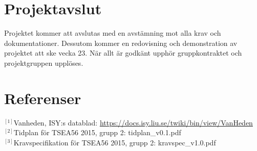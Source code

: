 \documentclass[11pt]{article}
\begin{document}
\begin{flushleft}
\section{Projektavslut}
Projektet kommer att avslutas med en avstämning mot alla krav och dokumentationer. Dessutom kommer en redovisning och demonstration av projektet att ske vecka 23. När allt är godkänt upphör gruppkontraktet och projektgruppen upplöses.
\\[0.1in]



\setcounter{secnumdepth}{0}
\pagebreak
\section{Referenser}


$^{[1]}$Vanheden, ISY:s datablad: \url{https://docs.isy.liu.se/twiki/bin/view/VanHeden} \\[0.1in]

$^{[2]}$Tidplan för TSEA56 2015, grupp 2: tidplan\_v0.1.pdf \\[0.1in]

$^{[3]}$Kravspecifikation för TSEA56 2015, grupp 2: kravspec\_v1.0.pdf \\[0.1in]

\setcounter{secnumdepth}{2}


\end{flushleft}
\end{document}
